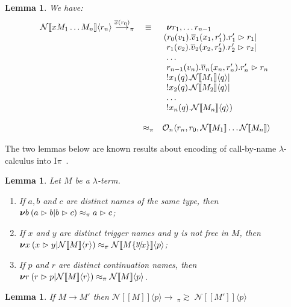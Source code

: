 \documentclass[11pt,a4paper]{amsart}
\theoremstyle{plain}
\theoremstyle{definition}
\theoremstyle{defC}
\theoremstyle{thmC}
\theoremstyle{plain}
\numberwithin{equation}{section}
\newcommand{\wb}{\bsim}
\newcommand{\bsim}{\wbPI} %
\newcommand{\pairP}[1]{  #1 }      %
\newcommand{\obj}[1]{\langle #1 \rangle}
\def\res#1{{\boldsymbol \nu} #1\:}   %
\def\inp#1#2{#1(#2)}
\def\inpw#1#2{#1(#2)}
\def\bout#1#2{\overline{#1}(#2)}   %
\newcommand{\inpi}[3]{ \inpw{#1_{#2}}{#3} }%
\newcommand{\bopi}[3]{ \overline{#1}_{#2}({#3}) }%
\def\app#1#2{#1\obj{#2}}                    %
\newcommand{\rmm}[1]{{\tt{\lowercase{#1}}}}
\newcommand{\genarr}[2]{\mathrel{\stackrel{{#1}}{\longrightarrow}_{\rmm{\lowercase{#2}}}}}
\newcommand{\arrPI}[1]{\genarr{#1}{\pi}}   %
\newcommand{\genwb}[1]{\mathrel{\approx_{\rmm{\lowercase{#1}}}}}       %
\newcommand{\wbPI}{\genwb{\pi}}       %
\newcommand{\contr}{\mathrel{\mbox{}_{\pi}\!\!\gtrsim}}
\newcommand{\encoN}[1]{{\mathcal {N}} [\! [ #1 ] \! ]  }
\newcommand{\encoNa}[2]{{\mathcal {N}} \app{[\! [ #1 ] \! ]}{#2}  }
\newcommand{\link}[2]{ #1 \vartriangleright #2} %
\newcommand{\Intp}{\mbox{I$\pi$}\xspace}   %
\newcommand{\piI}{\Intp}   %
\def\sub#1#2{\{\raisebox{.5ex}{\small$#1$}\! / \!\mbox{\small$#2$}\}}
\newcommand{\qOUT}{{\mathcal O}}
\newcommand{\OUTU}[5]{\app{\qOUT_{#1}}{#2, #3, #4  }}
\theoremstyle{plain}
\newtheorem{lemma}[thm]{Lemma}
\theoremstyle{definition}
\begin{document}
\begin{lemma} 
We have: 
\[
\begin{array}[t]{rcl}
\encoNa{ x M_1 \ldots M_n} {r_n}
\arrPI{\bout x{r_0}}
&\equiv  &
\begin{array}[t]{l}
\res{r_1, \ldots r_{n-1}} \\
\! \! (\inpi r 0 {v_1} . \bopi v 1{x_{1},r'_{1}}    .  \link {r'_{1}}{r_{1}}
 | \\
\inpi r 1 {v_2} . \bopi v 2{x_{2},r'_{2}}    .  \link {r'_{2}}{r_{2}}
 | \\
\ldots  \\
\inpi r {n-1} {v_n} . \bopi v n{x_{n},r'_{n}}    .  \link
{r'_{n}}{r_{n}} \\
  !  \inp {x_1} {q} . {\encoNa{M_1} {q} } | \\
  !  \inp {x_2} {q} . {\encoNa{M_2}{q} } | \\
\ldots  \\
  !  \inp {x_n} {q} . {\encoNa{M_n}{q} } )
\end{array}
\\ \ \\
&\wbPI &
\OUTU n {r_n}{r_0} {\encoN{M_1} \ldots \encoN{M_n}}{} 
\end{array}
\]
 \end{lemma}
\noindent
The two lemmas below are known results about encoding of call-by-name $\lambda$-calculus
into \piI\  \cite{San95i}. 


\begin{lemma} %
\label{l:sk}
 Let $M $ be a  $\lambda$-term.
$ $ 
\begin{enumerate}
\item  If  $a,b$ and $c$  are distinct names of the same type,  then 
  $\res b ( \link ab | \link bc ) \wb \link ac$; 


\item  If $x$ and $y$ are distinct  trigger  names and $y$ is not free in
$M$, then
  $\res{ x} (\link  xy  | \encoNa M r ) \wb \encoNa{ M
\sub y x} p$;   


\item  If $p$ and $r$ are distinct  continuation names, then 
 $\res{ r} (\link  r p | \encoNa M r ) \wb \encoNa  M p$.

\end{enumerate} 
\end{lemma} 


\begin{lemma} %
\label{l:beta_cbn}
If $M \longrightarrow M'$ then $\pairP {\encoNa M p } \longrightarrow \: {\contr}\; \pairP
{\encoNa        {M'} p }$
\end{lemma} 
\end{document}
